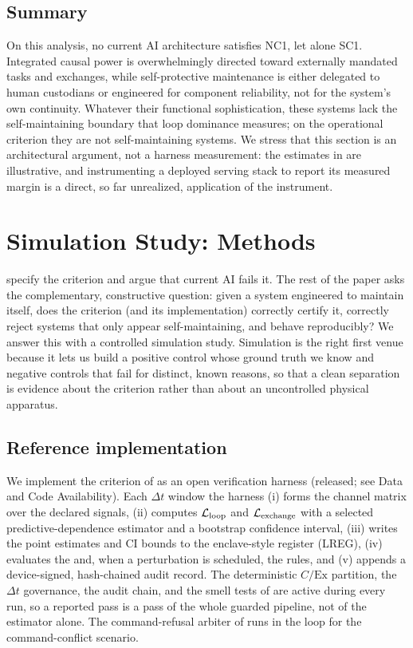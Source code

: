 \documentclass[11pt]{article}
\begin{document}
\subsection{Summary}

On this analysis, no current AI architecture satisfies NC1, let alone SC1. Integrated causal power is overwhelmingly directed toward externally mandated tasks and exchanges, while self-protective maintenance is either delegated to human custodians or engineered for component reliability, not for the system's own continuity. Whatever their functional sophistication, these systems lack the self-maintaining boundary that loop dominance measures; on the operational criterion they are not self-maintaining systems. We stress that this section is an architectural argument, not a harness measurement: the estimates in  are illustrative, and instrumenting a deployed serving stack to report its measured \NC margin is a direct, so far unrealized, application of the instrument.

\section{Simulation Study: Methods}
\label{sec:sim_methods}

 specify the criterion and argue that current AI fails it. The rest of the paper asks the complementary, constructive question: given a system engineered to maintain itself, does the criterion (and its implementation) correctly certify it, correctly reject systems that only appear self-maintaining, and behave reproducibly? We answer this with a controlled simulation study. Simulation is the right first venue because it lets us build a positive control whose ground truth we know and negative controls that fail for distinct, known reasons, so that a clean separation is evidence about the criterion rather than about an uncontrolled physical apparatus.

\subsection{Reference implementation}
\label{sec:harness}

We implement the criterion of  as an open verification harness (released; see Data and Code Availability). Each $\Delta t$ window the harness (i) forms the channel matrix over the declared signals, (ii) computes $\mathcal{L}_{\text{loop}}$ and $\mathcal{L}_{\text{exchange}}$ with a selected predictive-dependence estimator and a bootstrap confidence interval, (iii) writes the point estimates and CI bounds to the enclave-style register (LREG), (iv) evaluates the \NC and, when a perturbation is scheduled, the \SC rules, and (v) appends a device-signed, hash-chained audit record. The deterministic $C/\text{Ex}$ partition, the $\Delta t$ governance, the audit chain, and the smell tests of  are active during every run, so a reported pass is a pass of the whole guarded pipeline, not of the estimator alone. The command-refusal arbiter of  runs in the loop for the command-conflict scenario.
\end{document}
